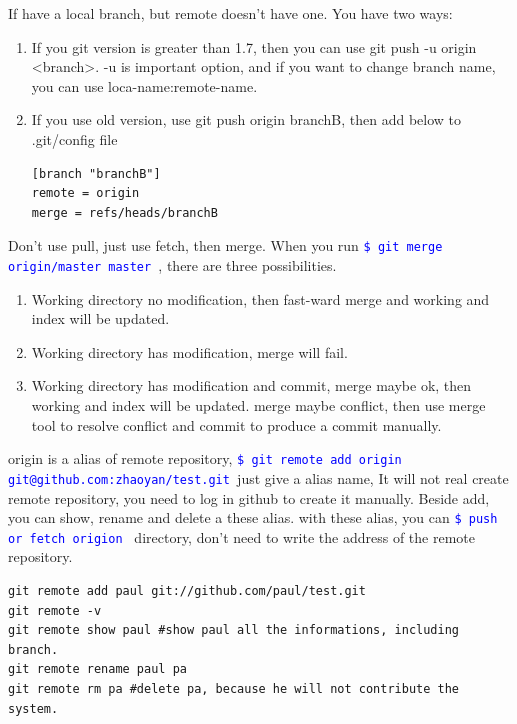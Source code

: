 \documentclass[paper=8.5in:11in, twoside, 12pt, pagesize=pdftex]{book}
\newcommand{\linuxcommand}[1]{\texttt{\textcolor{blue}{\$ #1 \Pisymbol{psy}{191}}}}
\begin{document}
	If have a local branch, but remote doesn't have one. You have two ways:
	\begin{enumerate}
		\item If you git version is greater than 1.7, then you can use git push -u origin <branch>. -u is important option, and if you want to change branch name, you can use loca-name:remote-name.
		
		\item If you use old version, use git push origin branchB, then add below to .git/config file
\begin{lstlisting}
[branch "branchB"]
remote = origin
merge = refs/heads/branchB	
\end{lstlisting}		
	\end{enumerate}
	
	Don't use pull, just use fetch, then merge.  When you run \linuxcommand{git merge origin/master master}, there are three possibilities. 
	\begin{enumerate}
		\item Working directory no modification, then fast-ward merge and working and index will be updated. 
		
		\item Working directory has modification, merge will fail. 
		
		\item Working directory has modification and commit, merge maybe ok, then working and index will be updated. merge maybe conflict, then use merge tool to resolve conflict and commit to produce a commit manually.
	\end{enumerate}
	
	
	origin is a alias of remote repository,  \linuxcommand{git remote add origin git@github.com:zhaoyan/test.git}just give a alias name, It will not real create remote repository, you need to log in github to create it manually.  Beside add, you can show, rename and delete a these alias. with these alias, you can \linuxcommand{push or fetch origion} directory, don't need to write the address of the remote repository.
	
\begin{lstlisting}
git remote add paul git://github.com/paul/test.git
git remote -v
git remote show paul #show paul all the informations, including branch.
git remote rename paul pa
git remote rm pa #delete pa, because he will not contribute the system.	
\end{lstlisting}
	
\end{document}
